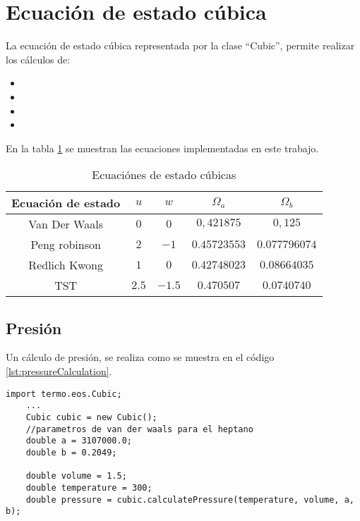 \section{Ecuación de estado cúbica}\label{sec:cubic}

	La ecuación de estado cúbica representada por la clase ``Cubic'', permite realizar los cálculos de: 
	\begin{itemize}
	\itemsep0ex
		\item{} 
		\item{}
		\item{}
		\item{}
	\end{itemize}

	En la tabla \ref{tab:cubics} se muestran las ecuaciones implementadas en este trabajo.
	\begin{table}[!h]
		\centering
		\caption{Ecuaciónes de estado cúbicas}\label{tab:cubics}
		\begin{tabular}{|c |c | c | c | c |}
			\hline
			Ecuación de estado  & $u$ & $w$ & $\Omega_a$&$\Omega_b$\\
			\hline
			Van Der Waals  & $0$ & $0$ & $0,421875$ & $0,125$\\
			\hline
			Peng robinson  & $2$ & $-1$ & $0.45723553$ & $0.077796074$\\
			\hline
			Redlich Kwong  & $1$ & $0$ & $0.42748023$ & $0.08664035$\\
			\hline
			TST  & $2.5$ & $-1.5$ &$ 0.470507$ & $0.0740740$\\
			\hline
		\end{tabular}		
	\end{table}

 \subsection{Presión}\label{subsec:pressure}

	Un cálculo de presión, se realiza como se muestra en el código \ref{lst:pressureCalculation}.
	\begin{lstlisting}[label=lst:pressureCalculation,caption=Cálculo de presión para el heptano con la ecuación de estado cúbica de Van Der Waals]
	import termo.eos.Cubic;
	...
	Cubic cubic = new Cubic();
	//parametros de van der waals para el heptano
	double a = 3107000.0;
	double b = 0.2049;

	double volume = 1.5;
	double temperature = 300;
	double pressure = cubic.calculatePressure(temperature, volume, a, b);
	\end{lstlisting}

